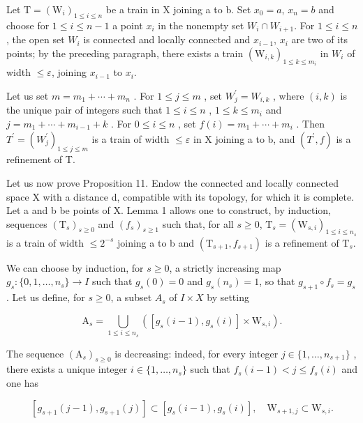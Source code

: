Let \(\mathrm{T}=(\mathrm{W}_{i})_{1\leqslant i\leqslant n}\) be a train in X joining a to b. Set \(x_{0}=a\), \(x_{n}=b\) and choose for \(1\leqslant i\leqslant n-1\) a point \(x_{i}\) in the nonempty set \(W_{i}\cap W_{i+1}\). For \(1\leqslant i\leqslant n\), the open set \(W_{i}\) is connected and locally connected and \(x_{i-1}\), \(x_{i}\) are two of its points; by the preceding paragraph, there exists a train \((\mathrm{W}_{i,k})_{1\leqslant k\leqslant m_{i}}\) in \(W_{i}\) of width \(\leqslant\varepsilon\), joining \(x_{i-1}\) to \(x_{i}\).

Let us set \(m = m_{1} + \cdots + m_{n}\) . For \(1 \leqslant j \leqslant m\) , set \(W_{j}^{\prime} = W_{i,k}\) , where \((i, k)\) is the unique pair of integers such that \(1 \leqslant i \leqslant n\) , \(1 \leqslant k \leqslant m_{i}\) and \(j = m_{1} + \cdots + m_{i-1} + k\) . For \(0 \leqslant i \leqslant n\) , set \(f(i) = m_{1} + \cdots + m_{i}\) . Then \(T^{\prime} = (W_{j}^{\prime})_{1 \leqslant j \leqslant m}\) is a train of width \(\leqslant \varepsilon\) in X joining a to b, and \((T^{\prime}, f)\) is a refinement of T.

Let us now prove Proposition 11. Endow the connected and locally connected space X with a distance d, compatible with its topology, for which it is complete. Let a and b be points of X. Lemma 1 allows one to construct, by induction, sequences \((\mathrm{T}_s)_{s \geqslant 0}\) and \((f_s)_{s \geqslant 1}\) such that, for all \(s \geqslant 0\), \(\mathrm{T}_s = (\mathrm{W}_{s,i})_{1 \leqslant i \leqslant n_s}\) is a train of width \(\leqslant 2^{-s}\) joining a to b and \((\mathrm{T}_{s+1}, f_{s+1})\) is a refinement of \(\mathrm{T}_s\).

We can choose by induction, for \(s \geqslant 0\), a strictly increasing map \(g_{s} \colon \{0,1,\ldots,n_{s}\} \to I\) such that \(g_{s}(0) = 0\) and \(g_{s}(n_{s}) = 1\), so that \(g_{s+1} \circ f_{s} = g_{s}\). Let us define, for \(s \geqslant 0\), a subset \(A_{s}\) of \(I \times X\) by setting

\[
\mathrm{A} _ {s} = \bigcup_ {1 \leqslant i \leqslant n _ {s}} ([ g _ {s} (i - 1), g _ {s} (i) ] \times \mathrm{W} _ {s, i}).
\]

The sequence \((\mathrm{A}_{s})_{s\geqslant0}\) is decreasing: indeed, for every integer \(j\in\{1,\ldots,n_{s+1}\}\) , there exists a unique integer \(i\in\{1,\ldots,n_{s}\}\) such that \(f_{s}(i-1)<j\leqslant f_{s}(i)\) and one has

\[
[ g _ {s + 1} (j - 1), g _ {s + 1} (j) ] \subset [ g _ {s} (i - 1), g _ {s} (i) ], \quad \mathrm{W} _ {s + 1, j} \subset \mathrm{W} _ {s, i}.
\]


